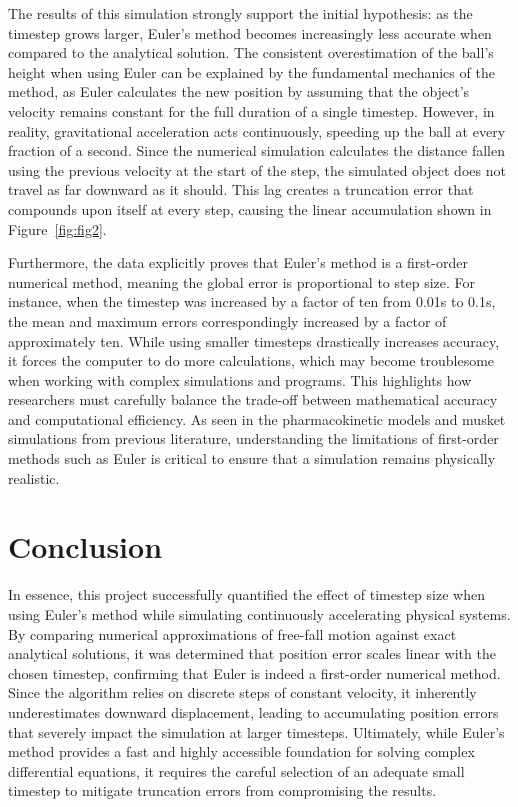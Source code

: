\documentclass[12pt]{article}
\begin{document}
The results of this simulation strongly support the initial hypothesis: as the timestep grows larger, Euler's method becomes increasingly less accurate when compared to the analytical solution. The consistent overestimation of the ball's height when using Euler can be explained by the fundamental mechanics of the method, as Euler calculates the new position by assuming that the object's velocity remains constant for the full duration of a single timestep. However, in reality, gravitational acceleration acts continuously, speeding up the ball at every fraction of a second. Since the numerical simulation calculates the distance fallen using the previous velocity at the start of the step, the simulated object does not travel as far downward as it should. This lag creates a truncation error that compounds upon itself at every step, causing the linear accumulation shown in Figure~\ref{fig:fig2}.

Furthermore, the data explicitly proves that Euler's method is a first-order numerical method, meaning the global error is proportional to step size. For instance, when the timestep was increased by a factor of ten from 0.01s to 0.1s, the mean and maximum errors correspondingly increased by a factor of approximately ten. While using smaller timesteps drastically increases accuracy, it forces the computer to do more calculations, which may become troublesome when working with complex simulations and programs. This highlights how researchers must carefully balance the trade-off between mathematical accuracy and computational efficiency. As seen in the pharmacokinetic models and musket simulations from previous literature, understanding the limitations of first-order methods such as Euler is critical to ensure that a simulation remains physically realistic.

\section{Conclusion}

In essence, this project successfully quantified the effect of timestep size when using Euler's method while simulating continuously accelerating physical systems. By comparing numerical approximations of free-fall motion against exact analytical solutions, it was determined that position error scales linear with the chosen timestep, confirming that Euler is indeed a first-order numerical method. Since the algorithm relies on discrete steps of constant velocity, it inherently underestimates downward displacement, leading to accumulating position errors that severely impact the simulation at larger timesteps. Ultimately, while Euler's method provides a fast and highly accessible foundation for solving complex differential equations, it requires the careful selection of an adequate small timestep to mitigate truncation errors from compromising the results.



\end{document}
